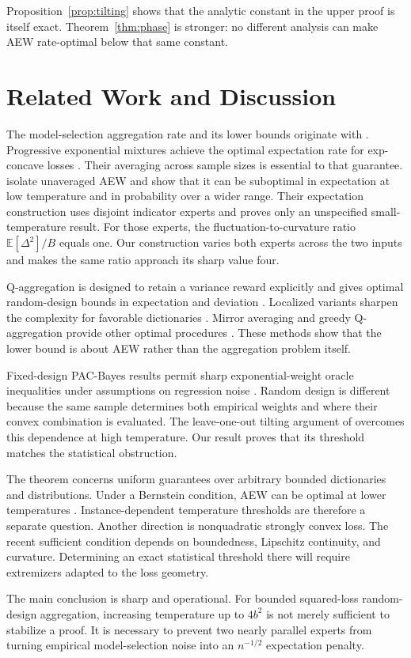 \documentclass[twoside]{article}
\newcommand{\E}{\mathbb E}
\newcommand{\1}{\mathbf 1}
\begin{document}
Proposition~\ref{prop:tilting} shows that the analytic constant in the upper proof is itself exact. Theorem~\ref{thm:phase} is stronger: no different analysis can make AEW rate-optimal below that same constant.

\section{Related Work and Discussion}

The model-selection aggregation rate and its lower bounds originate with \citet{tsybakov2003optimal}. Progressive exponential mixtures achieve the optimal expectation rate for exp-concave losses \citep{audibert2007progressive}. Their averaging across sample sizes is essential to that guarantee. \citet{lecue2013optimality} isolate unaveraged AEW and show that it can be suboptimal in expectation at low temperature and in probability over a wider range. Their expectation construction uses disjoint indicator experts and proves only an unspecified small-temperature result. For those experts, the fluctuation-to-curvature ratio $\E[\Delta^2]/B$ equals one. Our construction varies both experts across the two inputs and makes the same ratio approach its sharp value four.

Q-aggregation is designed to retain a variance reward explicitly and gives optimal random-design bounds in expectation and deviation \citep{lecue2014optimal}. Localized variants sharpen the complexity for favorable dictionaries \citep{mourtada2023local}. Mirror averaging and greedy Q-aggregation provide other optimal procedures \citep{juditsky2008mirror,dai2012deviation}. These methods show that the lower bound is about AEW rather than the aggregation problem itself.

Fixed-design PAC-Bayes results permit sharp exponential-weight oracle inequalities under assumptions on regression noise \citep{dalalyan2008aggregation}. Random design is different because the same sample determines both empirical weights and where their convex combination is evaluated. The leave-one-out tilting argument of \citet{hogsgaard2026aggregation} overcomes this dependence at high temperature. Our result proves that its threshold matches the statistical obstruction.

The theorem concerns uniform guarantees over arbitrary bounded dictionaries and distributions. Under a Bernstein condition, AEW can be optimal at lower temperatures \citep{lecue2013optimality}. Instance-dependent temperature thresholds are therefore a separate question. Another direction is nonquadratic strongly convex loss. The recent sufficient condition depends on boundedness, Lipschitz continuity, and curvature. Determining an exact statistical threshold there will require extremizers adapted to the loss geometry.

The main conclusion is sharp and operational. For bounded squared-loss random-design aggregation, increasing temperature up to $4b^2$ is not merely sufficient to stabilize a proof. It is necessary to prevent two nearly parallel experts from turning empirical model-selection noise into an $n^{-1/2}$ expectation penalty.



\clearpage
\appendix
\end{document}
